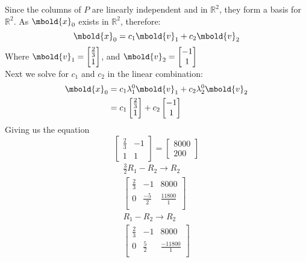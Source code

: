 \documentclass[12pt letter]{report}
\begin{document}
{  Since the columns of $P$ are linearly independent and in $\mathbb{R}^2$, they form a basis for $\mathbb{R}^2$. As
  $\mbold{x}_0$ exists in $\mathbb{R}^2$, therefore:
  \[
    \mbold{x}_0 = c_1 \mbold{v}_1 + c_2 \mbold{v}_2
  \]
  Where $\mbold{v}_1 = \begin{bmatrix} \frac{2}{3} \\ 1 \end{bmatrix} $, and $\mbold{v}_2 = \begin{bmatrix} -1 \\  1
    \end{bmatrix} $ \\

  \noindent  Next we solve for $c_1$ and $c_2$ in the linear combination:
  \begin{align*}
    \mbold{x}_0 & = c_1 \lambda^{0}_1 \mbold{v}_1 + c_2 \lambda^{0}_2 \mbold{v}_2                                  \\
                & = c_1 \begin{bmatrix} \frac{2}{3} \\ 1 \end{bmatrix} + c_2 \begin{bmatrix} -1 \\ 1 \end{bmatrix} \\
  \end{align*}
  Giving us the equation
  \[
    \begin{bmatrix}
      \frac{2}{3} & -1 \\
      1           & 1
    \end{bmatrix} = \begin{bmatrix} 8000 \\ 200 \end{bmatrix}
  \]
  \begin{align*}
    \frac{3}{2}R_1 - R_2  \rightarrow R_2 \\
    \begin{bmatrix}
      \frac{2}{3} & -1           & 8000            \\
      0           & \frac{-5}{2} & \frac{11800}{1} \\
    \end{bmatrix}
    \\
    R_1 - R_2  \rightarrow R_2            \\
    \begin{bmatrix}
      \frac{2}{3} & -1          & 8000             \\
      0           & \frac{5}{2} & \frac{-11800}{1} \\

\end{bmatrix}
\end{align*}}
\end{document}
